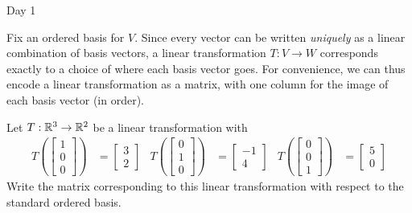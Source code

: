 \begin{applicationActivities}{Day 1}
\begin{observation}
Fix an ordered basis for $V$.  Since every vector can be written \textit{uniquely} as a linear combination of basis vectors, a linear transformation $T:V \rightarrow W$ corresponds exactly to a choice of where each basis vector goes.  For convenience, we can thus encode a linear transformation as a matrix, with one column for the image of each basis vector (in order).
\end{observation}

\begin{activity}
Let $T: \mathbb{R}^3 \rightarrow \mathbb{R}^2$ be a linear transformation with
\begin{align*}
T\left(\begin{bmatrix} 1 \\ 0 \\ 0 \end{bmatrix} \right) &= \begin{bmatrix} 3 \\ 2\end{bmatrix} &
T\left(\begin{bmatrix} 0 \\ 1 \\ 0 \end{bmatrix} \right) &= \begin{bmatrix} -1 \\ 4\end{bmatrix} &
T\left(\begin{bmatrix} 0 \\ 0 \\ 1 \end{bmatrix} \right) &= \begin{bmatrix} 5 \\ 0\end{bmatrix}
\end{align*}
Write the matrix corresponding to this linear transformation with respect to the standard ordered basis.
\end{activity}


\end{applicationActivities}
